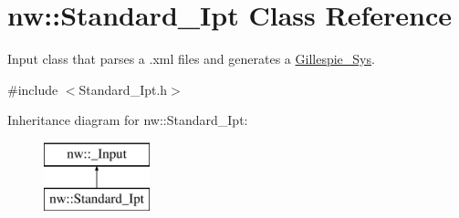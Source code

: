 \hypertarget{classnw_1_1_standard___ipt}{\section{nw\+:\+:Standard\+\_\+\+Ipt Class Reference}
\label{classnw_1_1_standard___ipt}
}


Input class that parses a .xml files and generates a \hyperlink{classnw_1_1_gillespie___sys}{Gillespie\+\_\+\+Sys}.  




{\ttfamily \#include $<$Standard\+\_\+\+Ipt.\+h$>$}

Inheritance diagram for nw\+:\+:Standard\+\_\+\+Ipt\+:\begin{figure}[H]
\begin{center}
\leavevmode
\includegraphics[height=2.000000cm]{d0/d19/classnw_1_1_standard___ipt}
\end{center}
\end{figure}
